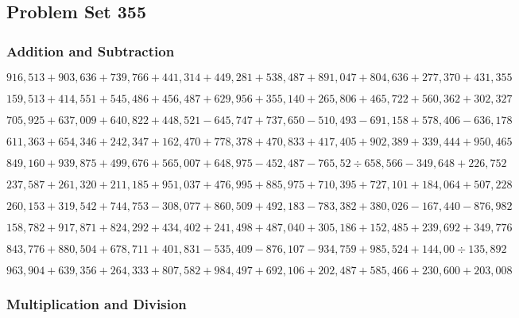 \hypertarget{problem-set-355}{%
\subsection{Problem Set 355}\label{problem-set-355}}

\hypertarget{addition-and-subtraction}{%
\subsubsection{Addition and
Subtraction}\label{addition-and-subtraction}}

\(916,513+903,636+739,766+441,314+449,281+538,487+891,047+804,636+277,370+431,355\)

\(159,513+414,551+545,486+456,487+629,956+355,140+265,806+465,722+560,362+302,327\)

\(705,925+637,009+640,822+448,521-645,747+737,650-510,493-691,158+578,406-636,178\)

\(611,363+654,346+242,347+162,470+778,378+470,833+417,405+902,389+339,444+950,465\)

\(849,160+939,875+499,676+565,007+648,975-452,487-765,52÷658,566-349,648+226,752\)

\(237,587+261,320+211,185+951,037+476,995+885,975+710,395+727,101+184,064+507,228\)

\(260,153+319,542+744,753-308,077+860,509+492,183-783,382+380,026-167,440-876,982\)

\(158,782+917,871+824,292+434,402+241,498+487,040+305,186+152,485+239,692+349,776\)

\(843,776+880,504+678,711+401,831-535,409-876,107-934,759+985,524+144,00÷135,892\)

\(963,904+639,356+264,333+807,582+984,497+692,106+202,487+585,466+230,600+203,008\)

\hypertarget{multiplication-and-division}{%
\subsubsection{Multiplication and
Division}\label{multiplication-and-division}}

